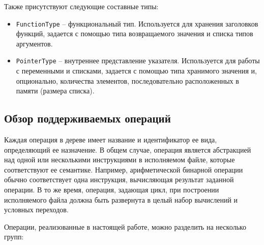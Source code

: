 Также присутствуют следующие составные типы:

\begin{itemize}
    \item \verb|FunctionType| -- функциональный тип.
          Используется для хранения заголовков функций, задается с помощью типа возвращаемого значения и списка типов аргументов.
    \item \verb|PointerType| -- внутреннее представление указателя.
          Используется для работы с переменными и списками, задается с помощью типа хранимого значения и, опционально, количества элементов, последовательно расположенных в памяти (размера списка).
\end{itemize}

\subsection{Обзор поддерживаемых операций}
\label{sec:optree_operations}

Каждая операция в дереве имеет название и идентификатор ее вида, определяющий ее назначение.
В общем случае, операция является абстракцией над одной или несколькими инструкциями в исполняемом файле, которые соответствуют ее семантике.
Например, арифметической бинарной операции обычно соответствует одна инструкция, вычисляющая результат заданной операции.
В то же время, операция, задающая цикл, при построении исполняемого файла должна быть развернута в целый набор вычислений и условных переходов.

Операции, реализованные в настоящей работе, можно разделить на несколько групп:


